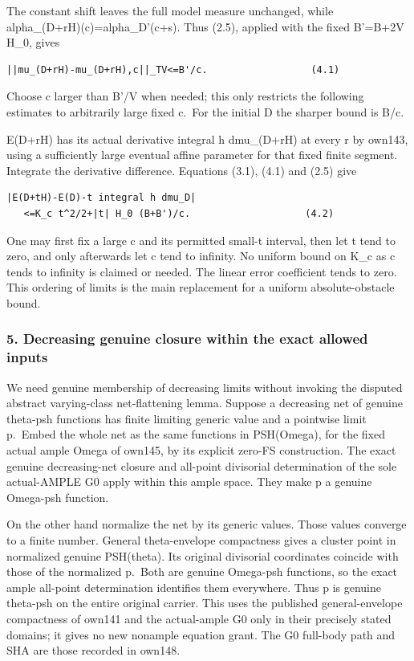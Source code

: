 \documentclass[
  10pt,
]{article}
\begin{document}
The constant shift leaves the full model measure unchanged, while
alpha\_(D+rH)(c)=alpha\_D'(c+s). Thus (2.5), applied with the fixed
B'=B+2V H\_0, gives

\begin{verbatim}
||mu_(D+rH)-mu_(D+rH),c||_TV<=B'/c.                  (4.1)
\end{verbatim}

Choose c larger than B'/V when needed; this only restricts the following
estimates to arbitrarily large fixed c.~For the initial D the sharper
bound is B/c.

E(D+rH) has its actual derivative integral h dmu\_(D+rH) at every r by
own143, using a sufficiently large eventual affine parameter for that
fixed finite segment. Integrate the derivative difference. Equations
(3.1), (4.1) and (2.5) give

\begin{verbatim}
|E(D+tH)-E(D)-t integral h dmu_D|
   <=K_c t^2/2+|t| H_0 (B+B')/c.                    (4.2)
\end{verbatim}

One may first fix a large c and its permitted small-t interval, then let
t tend to zero, and only afterwards let c tend to infinity. No uniform
bound on K\_c as c tends to infinity is claimed or needed. The linear
error coefficient tends to zero. This ordering of limits is the main
replacement for a uniform absolute-obstacle bound.

\subsubsection{5. Decreasing genuine closure within the exact allowed
inputs}\label{decreasing-genuine-closure-within-the-exact-allowed-inputs}

We need genuine membership of decreasing limits without invoking the
disputed abstract varying-class net-flattening lemma. Suppose a
decreasing net of genuine theta-psh functions has finite limiting
generic value and a pointwise limit p.~Embed the whole net as the same
functions in PSH(Omega), for the fixed actual ample Omega of own145, by
its explicit zero-FS construction. The exact genuine decreasing-net
closure and all-point divisorial determination of the sole actual-AMPLE
G0 apply within this ample space. They make p a genuine Omega-psh
function.

On the other hand normalize the net by its generic values. Those values
converge to a finite number. General theta-envelope compactness gives a
cluster point in normalized genuine PSH(theta). Its original divisorial
coordinates coincide with those of the normalized p.~Both are genuine
Omega-psh functions, so the exact ample all-point determination
identifies them everywhere. Thus p is genuine theta-psh on the entire
original carrier. This uses the published general-envelope compactness
of own141 and the actual-ample G0 only in their precisely stated
domains; it gives no new nonample equation grant. The G0 full-body path
and SHA are those recorded in own148.
\end{document}

